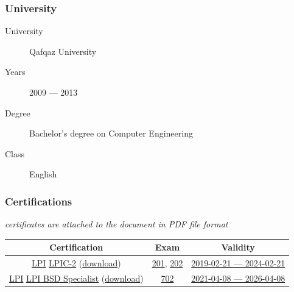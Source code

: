 \documentclass {article}
\begin{document}
      \subsubsection {University}
        \begin {description}
          \item [University] Qafqaz University
          \item [Years] 2009 --- 2013
          \item [Degree] Bachelor's degree on Computer Engineering
          \item [Class] English
        \end {description}

        \subsubsection {Certifications}
        \centering
        \textit {certificates are attached to the document in PDF file format} \\
          \begin {tabular} { c | c | c }
            \hline			
            \textbf {Certification} & \textbf {Exam} & \textbf {Validity} \\
            \hline  

            \href{https://en.wikipedia.org/wiki/Linux_Professional_Institute}{LPI} \href{https://www.lpi.org/our-certifications/lpic-2-overview}{LPIC-2} (\href{https://cs.lpi.org/caf/Xamman/candidate_area/certificate/LPIC-2/bafrejwgeb}{download}) & \href{https://www.lpi.org/our-certifications/exam-201-objectives}{201}, \href{https://www.lpi.org/our-certifications/exam-202-objectives}{202} & \href{https://cs.lpi.org/caf/Xamman/certification/verify/LPI000307519/bafrejwgeb}{2019-02-21 --- 2024-02-21} \\
            \href{https://en.wikipedia.org/wiki/Linux_Professional_Institute}{LPI} \href{https://www.lpi.org/our-certifications/bsd-overview}{LPI BSD Specialist} (\href{https://cs.lpi.org/caf/Xamman/candidate_area/certificate/BSDS/mvuk2szhhw}{download}) & \href{https://www.lpi.org/our-certifications/exam-702-objectives}{702} & \href{https://cs.lpi.org/caf/Xamman/certification/verify/LPI000307519/mvuk2szhhw}{2021-04-08 --- 2026-04-08} \\

            \hline  
          \end{tabular}
\end{document}
